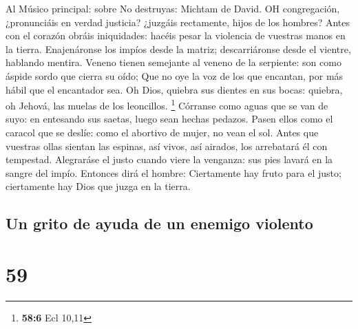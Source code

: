  Al Músico principal: sobre No destruyas: Michtam de David.
OH congregación, ¿pronunciáis en verdad justicia? ¿juzgáis rectamente,
hijos de los hombres?  Antes con el corazón obráis
iniquidades: hacéis pesar la violencia de vuestras manos en la tierra.
 Enajenáronse los impíos desde la matriz; descarriáronse
desde el vientre, hablando mentira.  Veneno tienen semejante
al veneno de la serpiente: son como áspide sordo que cierra su oído;
 Que no oye la voz de los que encantan, por más hábil que el
encantador sea.  Oh Dios, quiebra sus dientes en sus bocas:
quiebra, oh Jehová, las muelas de los leoncillos. \footnote{\textbf{58:6}
  Ecl 10,11}  Córranse como aguas que se van de suyo: en
entesando sus saetas, luego sean hechas pedazos.  Pasen
ellos como el caracol que se deslíe: como el abortivo de mujer, no vean
el sol.  Antes que vuestras ollas sientan las espinas, así
vivos, así airados, los arrebatará él con tempestad. 
Alegraráse el justo cuando viere la venganza: sus pies lavará en la
sangre del impío.  Entonces dirá el hombre: Ciertamente hay
fruto para el justo; ciertamente hay Dios que juzga en la tierra.

\hypertarget{un-grito-de-ayuda-de-un-enemigo-violento}{%
\subsection{Un grito de ayuda de un enemigo
violento}\label{un-grito-de-ayuda-de-un-enemigo-violento}}

\hypertarget{section-58}{%
\section{59}\label{section-58}}

